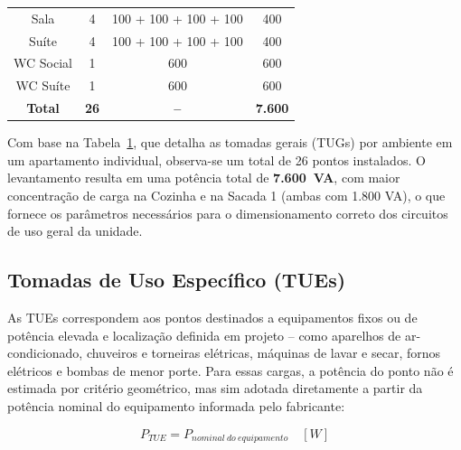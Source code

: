 \documentclass[12pt,openright,oneside,a4paper,brazil]{abntex2}
\begin{document}
\begin{table}[H]
\begin{tabular}{cccc}
Sala                               & 4                                    & 100 + 100 + 100 + 100      & 400                     \\
Suíte                              & 4                                    & 100 + 100 + 100 + 100      & 400                     \\
WC Social                          & 1                                    & 600                        & 600                     \\
WC Suíte                           & 1                                    & 600                        & 600                     \\
\midrule \rowcolor[HTML]{ffc187}
\textbf{Total}                     & \textbf{26}                          & \textbf{--}                & \textbf{7.600}          \\
\bottomrule

\end{tabular}
\label{tab:tomadas_gerais_apartamento_individual}
\end{table}

Com base na Tabela~\ref{tab:tomadas_gerais_apartamento_individual}, que detalha as tomadas gerais (TUGs) por ambiente em um apartamento individual, observa-se um total de 26 pontos instalados. O levantamento resulta em uma potência total de \textbf{7.600~VA}, com maior concentração de carga na Cozinha e na Sacada 1 (ambas com 1.800 VA), o que fornece os parâmetros necessários para o dimensionamento correto dos circuitos de uso geral da unidade.

\subsection{Tomadas de Uso Específico (TUEs)}

\hspace{1.27cm} As TUEs correspondem aos pontos destinados a equipamentos fixos ou de
potência elevada e localização definida em projeto -- como aparelhos de
ar-condicionado, chuveiros e torneiras elétricas, máquinas de lavar e
secar, fornos elétricos e bombas de menor porte. Para essas cargas, a
potência do ponto {não} é estimada por critério geométrico, mas sim
adotada diretamente a partir da potência nominal do equipamento informada
pelo fabricante:

\begin{equation}
    P_{TUE} = P_{nominal\ do\ equipamento} \quad [\si{W}]
    \label{eq:tue}
\end{equation}
\end{document}
